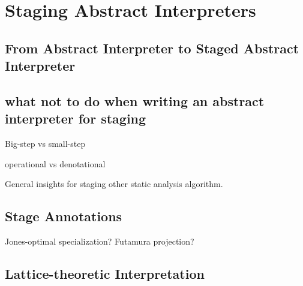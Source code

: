\section{Staging Abstract Interpreters} \label{sai}

\subsection{From Abstract Interpreter to Staged Abstract Interpreter}

\subsection{what not to do when writing an abstract interpreter for staging}

Big-step vs small-step

operational vs denotational

General insights for staging other static analysis algorithm.

\cite{10.1007/3-540-61580-6_11}

\subsection{Stage Annotations}

Jones-optimal specialization?
Futamura projection?

\subsection{Lattice-theoretic Interpretation}

